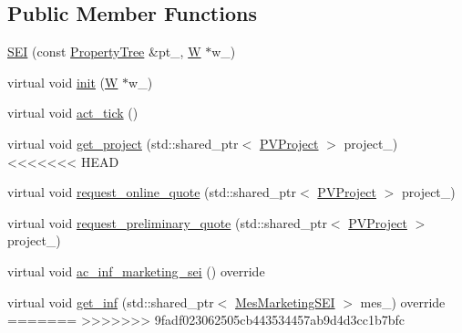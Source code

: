 \subsection*{Public Member Functions}
{\bf }\par
\begin{DoxyCompactItemize}
\item 
\hyperlink{classsolar__core_1_1_s_e_i_af885d50c89decf5b6ff208c24cedd82b}{S\+E\+I} (const \hyperlink{namespacesolar__core_adeda2737d6938c190eb774a5b2495045}{Property\+Tree} \&pt\+\_\+, \hyperlink{classsolar__core_1_1_w}{W} $\ast$w\+\_\+)
\item 
virtual void \hyperlink{classsolar__core_1_1_s_e_i_aecd2436dcb77c31480dc3ef3fcda172d}{init} (\hyperlink{classsolar__core_1_1_w}{W} $\ast$w\+\_\+)
\end{DoxyCompactItemize}

{\bf }\par
\begin{DoxyCompactItemize}
\item 
virtual void \hyperlink{classsolar__core_1_1_s_e_i_ab0bd6ae650afc15fe71ce545373ab16e}{act\+\_\+tick} ()
\item 
virtual void \hyperlink{classsolar__core_1_1_s_e_i_ad3730a5f71a2932744916a5a62753c97}{get\+\_\+project} (std\+::shared\+\_\+ptr$<$ \hyperlink{classsolar__core_1_1_p_v_project}{P\+V\+Project} $>$ project\+\_\+)
<<<<<<< HEAD
\end{DoxyCompactItemize}

{\bf }\par
\begin{DoxyCompactItemize}
\item 
virtual void \hyperlink{classsolar__core_1_1_s_e_i_a704af1e2cacd1aba86d5ac406f2231ce}{request\+\_\+online\+\_\+quote} (std\+::shared\+\_\+ptr$<$ \hyperlink{classsolar__core_1_1_p_v_project}{P\+V\+Project} $>$ project\+\_\+)
\item 
virtual void \hyperlink{classsolar__core_1_1_s_e_i_aa34d9c40613ff61fc0c8c911e0734441}{request\+\_\+preliminary\+\_\+quote} (std\+::shared\+\_\+ptr$<$ \hyperlink{classsolar__core_1_1_p_v_project}{P\+V\+Project} $>$ project\+\_\+)
\item 
virtual void \hyperlink{classsolar__core_1_1_s_e_i_aa44745e1e93c45d163981751848e21e9}{ac\+\_\+inf\+\_\+marketing\+\_\+sei} () override
\item 
virtual void \hyperlink{classsolar__core_1_1_s_e_i_aefbf747021fcb1f48742b0dd3bc7757f}{get\+\_\+inf} (std\+::shared\+\_\+ptr$<$ \hyperlink{classsolar__core_1_1_mes_marketing_s_e_i}{Mes\+Marketing\+S\+E\+I} $>$ mes\+\_\+) override
=======
>>>>>>> 9fadf023062505cb443534457ab9d4d3cc1b7bfc
\end{DoxyCompactItemize}

